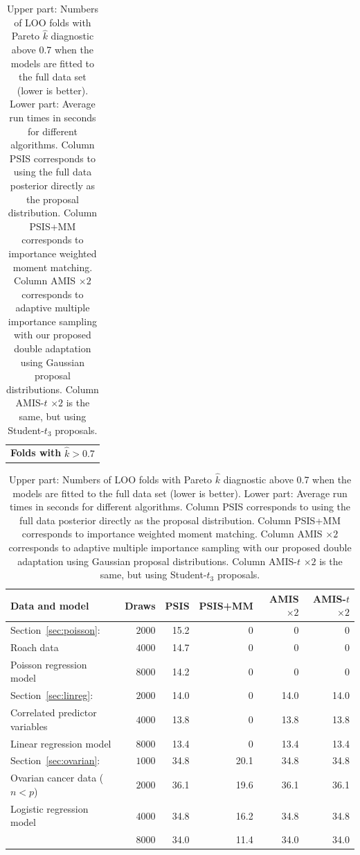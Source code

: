 \documentclass[12pt]{article}
\begin{document}
\begin{table}[tb]
\centering
\caption{Upper part: Numbers of LOO folds with Pareto $\hat{k}$ diagnostic above 0.7 when the models are fitted to the full data set (lower is better).
Lower part: Average run times in seconds for different algorithms.
%
Column PSIS corresponds to using the full data posterior directly
as the proposal distribution.
Column PSIS+MM corresponds to importance weighted
moment matching.
Column AMIS $\times 2$
corresponds to adaptive multiple importance sampling with our proposed double adaptation
using Gaussian proposal distributions. Column AMIS-$t$ $\times 2$ is the same, but
using Student-$t_3$ proposals.}
\label{tab:results}
\begin{tabular}{ c }
%
%
 \textbf{Folds with} $\hat{k} > 0.7$  \\
\end{tabular}
\begin{tabular}{ l r r r r r }
\toprule
Data and model & Draws & PSIS & PSIS+MM & AMIS $\times 2$  & AMIS-$t$ $\times 2$ \\
\midrule

%
%


%
Section~\ref{sec:poisson}:         & $2000$  & 15.2 & 0 & 0 & 0  \\
\;Roach data                         & $4000$  & 14.7 & 0 & 0 & 0 \\
\;Poisson regression model           & $8000$  & 14.2 & 0 & 0 & 0 \\
\hline                                    
%
%
%
%
%
%
%
Section~\ref{sec:linreg}:        & $2000$  & 14.0 & 0      & 14.0 & 14.0 \\
\;Correlated predictor variables                              & $4000$  & 13.8 & 0      & 13.8 & 13.8 \\
\;Linear regression model                                 & $8000$  & 13.4 & 0      & 13.4 & 13.4 \\

\hline                                    
Section~\ref{sec:ovarian}:        & $1000$  & 34.8 & 20.1 & 34.8 & 34.8  \\
\;Ovarian cancer data ($n < p$)               & $2000$  & 36.1 & 19.6 & 36.1 & 36.1  \\
\;Logistic regression model         & $4000$  & 34.8 & 16.2 & 34.8 & 34.8 \\
                                  & $8000$  & 34.0 & 11.4 & 34.0 & 34.0  \\
%
%
%
%
%
%
%
%
%
\bottomrule


\end{tabular}
\end{table}
\end{document}
